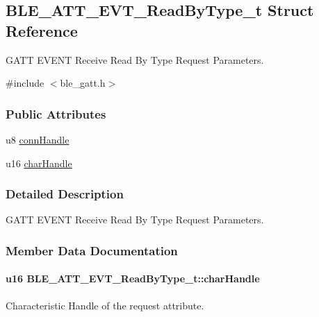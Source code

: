 \hypertarget{struct_b_l_e___a_t_t___e_v_t___read_by_type__t}{}\subsection{B\+L\+E\+\_\+\+A\+T\+T\+\_\+\+E\+V\+T\+\_\+\+Read\+By\+Type\+\_\+t Struct Reference}
\label{struct_b_l_e___a_t_t___e_v_t___read_by_type__t}


G\+A\+TT E\+V\+E\+NT Receive Read By Type Request Parameters.  




{\ttfamily \#include $<$ble\+\_\+gatt.\+h$>$}

\subsubsection*{Public Attributes}
\begin{DoxyCompactItemize}
\item 
u8 \hyperlink{struct_b_l_e___a_t_t___e_v_t___read_by_type__t_abd47a7bd730cdcf9c1e88da75632d4cd}{conn\+Handle}
\item 
u16 \hyperlink{struct_b_l_e___a_t_t___e_v_t___read_by_type__t_a1cf20bbe50803832430d253493e91a92}{char\+Handle}
\end{DoxyCompactItemize}


\subsubsection{Detailed Description}
G\+A\+TT E\+V\+E\+NT Receive Read By Type Request Parameters. 

\subsubsection{Member Data Documentation}
\paragraph[{\texorpdfstring{char\+Handle}{charHandle}}]{\setlength{\rightskip}{0pt plus 5cm}u16 B\+L\+E\+\_\+\+A\+T\+T\+\_\+\+E\+V\+T\+\_\+\+Read\+By\+Type\+\_\+t\+::char\+Handle}\hypertarget{struct_b_l_e___a_t_t___e_v_t___read_by_type__t_a1cf20bbe50803832430d253493e91a92}{}\label{struct_b_l_e___a_t_t___e_v_t___read_by_type__t_a1cf20bbe50803832430d253493e91a92}
Characteristic Handle of the request attribute. 
